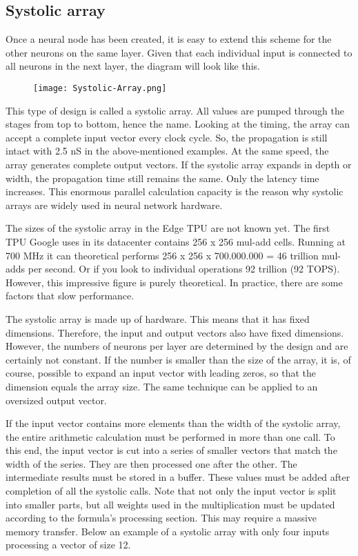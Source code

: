 \subsection{Systolic array}
\label{ssec:hard-systolic-array}
Once a neural node has been created, it is easy to extend this scheme for the
other neurons on the same layer. Given that each individual input is connected
to all neurons in the next layer, the diagram will look like this.
%
\begin{figure}[htb]
	\centering
	\texttt{[image: Systolic-Array.png]}
	\label{fig:systolic-array-edge-tpu}
\end{figure}
%
%
This type of design is called a systolic array. All values are pumped through
the stages from top to bottom, hence the name. Looking at the timing, the array
can accept a complete input vector every clock cycle. So, the propagation is
still intact with 2.5 nS in the above-mentioned examples. At the same speed, the
array generates complete output vectors. If the systolic array expands in depth
or width, the propagation time still remains the same. Only the latency time
increases. This enormous parallel calculation capacity is the reason why
systolic arrays are widely used in neural network hardware.
 
The sizes of the systolic array in the Edge TPU are not known yet. The first TPU
Google uses in its datacenter contains 256 x 256 mul-add cells. Running at 700
MHz it can theoretical performs 256 x 256 x 700.000.000 = 46 trillion mul-adds
per second. Or if you look to individual operations 92 trillion (92 TOPS).
However, this impressive figure is purely theoretical. In practice, there are
some factors that slow performance.
 
The systolic array is made up of hardware. This means that it has fixed
dimensions. Therefore, the input and output vectors also have fixed dimensions.
However, the numbers of neurons per layer are determined by the design and are
certainly not constant. If the number is smaller than the size of the array, it
is, of course, possible to expand an input vector with leading zeros, so that
the dimension equals the array size. The same technique can be applied to an
oversized output vector.

If the input vector contains more elements than the width of the systolic array,
the entire arithmetic calculation must be performed in more than one call. To
this end, the input vector is cut into a series of smaller vectors that match
the width of the series. They are then processed one after the other. The
intermediate results must be stored in a buffer. These values must be added
after completion of all the systolic calls. Note that not only the input vector
is split into smaller parts, but all weights used in the multiplication must be
updated according to the formula's processing section. This may require a
massive memory transfer. Below an example of a systolic array with only four
inputs processing a vector of size 12.
%

